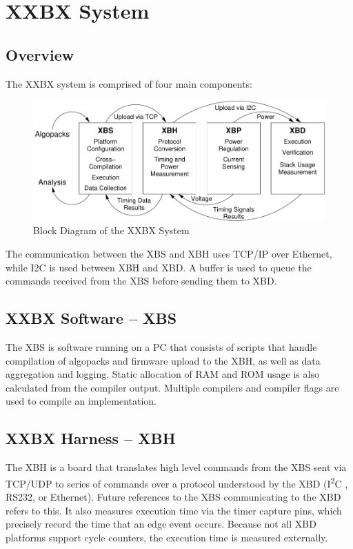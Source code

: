 \documentclass[twoside,11pt]{cergdoc}
\newcommand{\ITwoC}{I\textsuperscript{2}C }
\begin{document}
\chapter{XXBX System}
  \section{Overview}
The XXBX system is comprised of four main
components:

\begin{figure}[ht]
  \begin{center}
    \includegraphics[scale=0.8]{figures/xxbx_block}
    \caption{Block Diagram of the XXBX System}\label{fig:xxbxsystem}
  \end{center}
\end{figure}



The communication between the XBS and XBH uses
TCP/IP over Ethernet, while I2C is used between
XBH and XBD. A buffer is used to queue the
commands received from the XBS before sending
them to XBD.

  \section{XXBX Software -- XBS}
The XBS is software running on a PC that consists of scripts that handle
compilation of algopacks and firmware upload to the
XBH, as well as data aggregation and logging. Static allocation of RAM and ROM
usage is also calculated from the compiler output. Multiple compilers and
compiler flags are used to compile an implementation.

  \section{XXBX Harness -- XBH}
The XBH is a board that translates high level commands from the XBS sent via
TCP/UDP to series of commands over a protocol understood by the XBD
(\ITwoC, RS232, or Ethernet). Future references to the XBS communicating to the
XBD refers to this.
It also measures execution time via the timer capture pins, which precisely
record the time that an edge event occurs. Because not all XBD
platforms support cycle counters, the execution time is measured externally.
\end{document}

